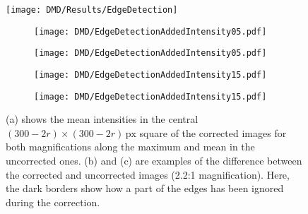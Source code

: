 \begin{figure}[htbp]
    \centering
    \begin{minipage}[c][8.815cm][t]{0.67\textwidth}
        \vfill
        \centering
        \texttt{[image: DMD/Results/EdgeDetection]}
        \label{fig:dmd_results_edgedetection}
    \end{minipage}
    \hfill
    \begin{minipage}[c][8.815cm][t]{.269\textwidth}
        \begin{subfigure}[T]{0.72\textwidth}
            \centering
            \texttt{[image: DMD/EdgeDetectionAddedIntensity05.pdf]}
            \label{fig:edge_detection_test_example1}
        \end{subfigure}
        \hspace{-0.06\textwidth}
        \begin{subfigure}[T]{0.24\textwidth}
            \texttt{[image: DMD/EdgeDetectionAddedIntensity05.pdf]}
        \end{subfigure}
        \vfill
        \begin{subfigure}[T]{0.72\textwidth}
            \centering
            \texttt{[image: DMD/EdgeDetectionAddedIntensity15.pdf]}
            \label{fig:edge_detection_test_example2}
        \end{subfigure}
        \hspace{-0.06\textwidth}
        \begin{subfigure}[T]{0.24\textwidth}
            \texttt{[image: DMD/EdgeDetectionAddedIntensity15.pdf]}
        \end{subfigure}
    \end{minipage}
    \caption[Influence of the edge detection range on the intensity in the centre]{(a) shows the mean intensities in the central $(300-2r)\times(300-2r)\,\mathrm{px}$ square of the corrected images for both magnifications along the maximum and mean in the uncorrected ones. (b) and (c) are examples of the difference between the corrected and uncorrected images (2.2:1 magnification). Here, the dark borders show how a part of the edges has been ignored during the correction.}
\end{figure}



